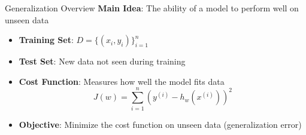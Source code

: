 \documentclass[serif, aspectratio=169]{beamer}
\begin{document}






\begin{frame}{Generalization Overview}
    \textbf{Main Idea}: The ability of a model to perform well on unseen data
    \begin{itemize}
        \item \textbf{Training Set}: \( D = \{(x_i, y_i)\}_{i=1}^n \)
        \item \textbf{Test Set}: New data not seen during training
        \item \textbf{Cost Function}: Measures how well the model fits data
        \[
        J(w) = \sum_{i=1}^{n} (y^{(i)} - h_w(x^{(i)}))^2
        \]
        \item \textbf{Objective}: Minimize the cost function on unseen data (generalization error)
    \end{itemize}
\end{frame}
\end{document}
